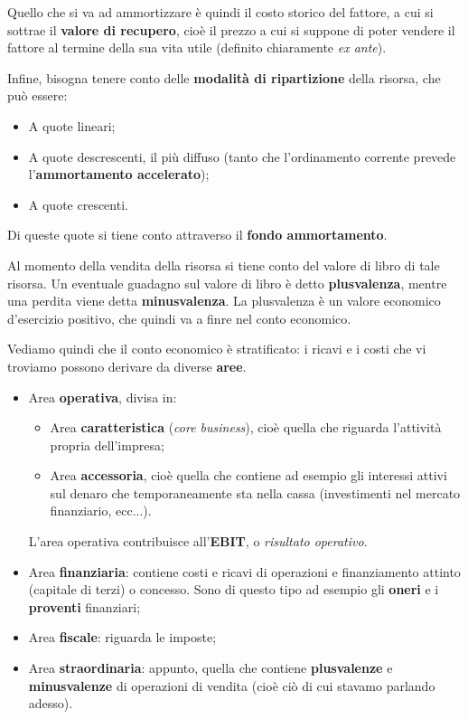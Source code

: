 \documentclass[a4paper,11pt]{article}
\begin{document}
Quello che si va ad ammortizzare è quindi il costo storico del fattore, a cui si sottrae il \textbf{valore di recupero}, cioè il prezzo a cui si suppone di poter vendere il fattore al termine della sua vita utile (definito chiaramente \textit{ex ante}).

Infine, bisogna tenere conto delle \textbf{modalità di ripartizione} della risorsa, che può essere:
\begin{itemize}
	\item A quote lineari;
	\item A quote descrescenti, il più diffuso (tanto che l'ordinamento corrente prevede l'\textbf{ammortamento accelerato});
	\item A quote crescenti.
\end{itemize}
Di queste quote si tiene conto attraverso il \textbf{fondo ammortamento}.

Al momento della vendita della risorsa si tiene conto del valore di libro di tale risorsa.
Un eventuale guadagno sul valore di libro è detto \textbf{plusvalenza}, mentre una perdita viene detta \textbf{minusvalenza}.
La plusvalenza è un valore economico d'esercizio positivo, che quindi va a finre nel conto economico.

Vediamo quindi che il conto economico è stratificato: i ricavi e i costi che vi troviamo possono derivare da diverse \textbf{aree}.
\begin{itemize}
	\item Area \textbf{operativa}, divisa in:
	\begin{itemize}
	\item Area \textbf{caratteristica} (\textit{core business}), cioè quella che riguarda l'attività propria dell'impresa;
	\item Area \textbf{accessoria}, cioè quella che contiene ad esempio gli interessi attivi sul denaro che temporaneamente sta nella cassa (investimenti nel mercato finanziario, ecc...).
	\end{itemize}

	L'area operativa contribuisce all'\textbf{EBIT}, o \textit{risultato operativo}.

	\item Area \textbf{finanziaria}: contiene costi e ricavi di operazioni e finanziamento attinto (capitale di terzi) o concesso.
		Sono di questo tipo ad esempio gli \textbf{oneri} e i \textbf{proventi} finanziari;
	\item Area \textbf{fiscale}: riguarda le imposte;
	\item Area \textbf{straordinaria}: appunto, quella che contiene \textbf{plusvalenze} e \textbf{minusvalenze} di operazioni di vendita (cioè ciò di cui stavamo parlando adesso).
\end{itemize}
\end{document}
